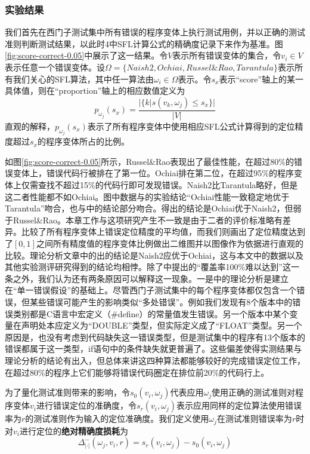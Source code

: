 \subsubsection{实验结果}
\label{subsection: compr result}
我们首先在西门子测试集中所有错误的程序变体上执行测试用例，并以正确的测试准则判断测试结果，以此时4中SFL计算公式的精确度记录下来作为基准。图\ref{fig:score-correct-0.05}中展示了这一结果。令$V$表示所有错误变体的集合，令$v_i \in V$表示任意一个错误变体。设$\Omega = \{Naish2, Ochiai, Russel\&Rao, Tarantula\}$表示所有我们关心的SFL算法，其中任一算法由$\omega_i\in \Omega$表示。令$s_x$表示“score”轴上的某一具体值，则在“proportion”轴上的相应数值定义为
$$
p_{\omega_j}(s_x) = \frac{|\{k|s(v_k, \omega_j) \le s_x\}|}{|V|}
$$
直观的解释，$p_{\omega_j}(s_x)$表示了所有程序变体中使用相应SFL公式计算得到的定位精度超过$s_x$的程序变体所占的比例。

如图\ref{fig:score-correct-0.05}所示，Russel\&Rao表现出了最佳性能，在超过80\%的错误变体上，错误代码行被排在了第一位。Ochiai排在第二位，在超过95\%的程序变体上仅需查找不超过15\%的代码行即可发现错误。Naish2比Tarantula略好，但是这二者性能都不如Ochiai。图中数据与\cite{4041886}的实验结论“Ochiai性能一致稳定地优于Tarantula”吻合，也与\cite{6676912}中的结论部分吻合。\cite{6676912}得出的结论是Ochiai优于Naish2，但弱于Russel\&Rao。本章工作与这项研究产生不一致是由于二者的评价标准略有差异。\cite{6676912}比较了所有程序变体上错误定位精度的平均值，而我们则画出了定位精度达到了$[0,1]$之间所有精度值的程序变体比例做出二维图并以图像作为依据进行直观的比较。理论分析文章\cite{xie2013theoretical}中的出的结论是Naish2应优于Ochiai，这与本文中的数据以及其他实验测评研究得到的结论均相悖。除了\cite{6676912}中提出的“覆盖率100\%难以达到”这一条之外，我们认为还有两条原因可以解释这一现象。一是\cite{xie2013theoretical}中的理论分析是建立在“单一错误假设”的基础上。尽管西门子测试集中的每个程序变体都仅包含一个错误，但某些错误可能产生的影响类似“多处错误”。例如我们发现有8个版本中的错误类别都是C语言中宏定义（\#define）的常量值发生错误。另一个版本中某个变量在声明处本应定义为“DOUBLE”类型，但实际定义成了“FLOAT”类型。另一个原因是，\cite{xie2013theoretical}也没有考虑到代码缺失这一错误类型，但是测试集中的程序有13个版本的错误都属于这一类型，if语句中的条件缺失就更普遍了。这些偏差使得实测结果与理论分析的结论有出入，但总体来讲这四种算法都能够较好的完成错误定位工作，在超过80\%的程序上它们能够将错误代码圈定在排位前20\%的代码行上。

为了量化测试准则带来的影响，令$s_0(v_i, \omega_j)$代表应用$\omega_j$使用正确的测试准则对程序变体$v_i$进行错误定位的准确度，令$s_r(v_i, \omega_j)$表示应用同样的定位算法使用错误率为$r$的测试准则作为输入的定位准确度。我们定义使用$\omega_j$在测试准则错误率为$r$时对$v_i$进行定位的\textbf{绝对精确度损耗}为
$$
\Delta_{|\cdot|}^{-}(\omega_j, v_i, r) = s_r(v_i, \omega_j) - s_0(v_i, \omega_j)
$$

